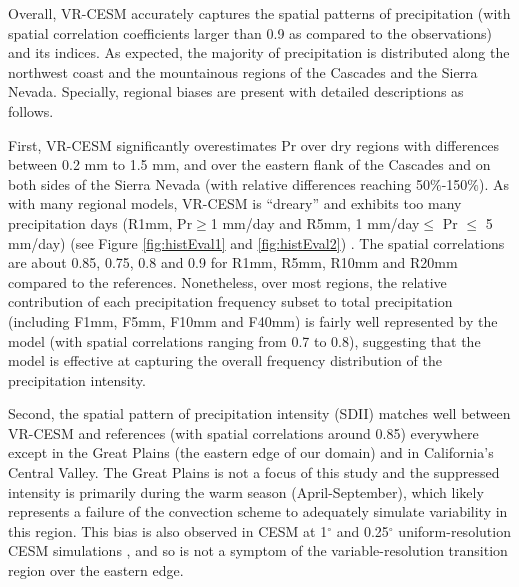 \documentclass{ametsoc}
\begin{document}

Overall, VR-CESM accurately captures the spatial patterns of precipitation (with spatial correlation coefficients larger than 0.9 as compared to the observations) and its indices. As expected, the majority of precipitation is distributed along the northwest coast and the mountainous regions of the Cascades and the Sierra Nevada. Specially, regional biases are present with detailed descriptions as follows.

First, VR-CESM significantly overestimates Pr over dry regions with differences between 0.2 mm to 1.5 mm, and over the eastern flank of the Cascades and on both sides of the Sierra Nevada (with relative differences reaching 50$\%$-150$\%$).  As with many regional models, VR-CESM is ``dreary'' and exhibits too many precipitation days (R1mm, Pr$\geq$1 mm/day and R5mm, 1 mm/day$\leq$ Pr $\leq$ 5 mm/day) (see Figure \ref{fig:histEval1} and \ref{fig:histEval2}) \citep{stephens2010dreary}. The spatial correlations are about 0.85, 0.75, 0.8 and 0.9 for R1mm, R5mm, R10mm and R20mm compared to the references. Nonetheless, over most regions, the relative contribution of each precipitation frequency subset to total precipitation (including F1mm, F5mm, F10mm and F40mm) is fairly well represented by the model (with spatial correlations ranging from 0.7 to 0.8), suggesting that the model is effective at capturing the overall frequency distribution of the precipitation intensity.

Second, the spatial pattern of precipitation intensity (SDII) matches well between VR-CESM and references (with spatial correlations around 0.85) everywhere except in the Great Plains (the eastern edge of our domain) and in California's Central Valley.  The Great Plains is not a focus of this study and the suppressed intensity is primarily during the warm season (April-September), which likely represents a failure of the convection scheme to adequately simulate variability in this region.  This bias is also observed in CESM at 1$^\circ$ and 0.25$^\circ$ uniform-resolution CESM simulations \citep{small2014new}, and so is not a symptom of the variable-resolution transition region over the eastern edge.
\end{document}
